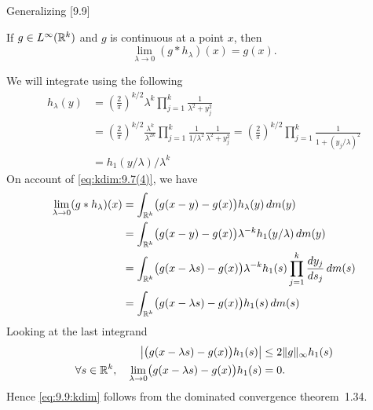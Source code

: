\begin{enumerate}
Generalizing [9.9]
\begin{llem} \label{lem:9.9:kdim}
If \(g\in L^\infty(\mathbb{R}^k)\) and $g$ is continuous at a point $x$, then
\begin{equation}
\lim_{\lambda\to 0} (g \ast h_\lambda)(x) = g(x). \label{eq:9.9:kdim}
\end{equation}
\end{llem}
\begin{thmproof}
We will integrate using the following
\begin{align*}
h_\lambda(y)
&= \left(\frac{2}{\pi}\right)^{k/2} \lambda^k
   \prod_{j=1}^k \frac{1}{\lambda^2+y_j^2}
  \\
&= \left(\frac{2}{\pi}\right)^{k/2} \frac{\lambda^k}{\lambda^{2k}}
   \prod_{j=1}^k \frac{1}{1/\lambda^2}\frac{1}{\lambda^2+y_j^2}
=  \left(\frac{2}{\pi}\right)^{k/2} 
   \prod_{j=1}^k \frac{1}{1+(y_j/\lambda)^2}
 \\
&= h_1(y/\lambda) / \lambda^k
\end{align*}
On account of \eqref{eq:kdim:9.7(4)}, we have
\begin{align*}
\lim_{\lambda\to 0} (g \ast h_\lambda)(x) 
&= \int_{\mathbb{R}^k} \bigl(g(x-y) - g(x)\bigr)h_\lambda(y)\,dm(y) \\
&= \int_{\mathbb{R}^k} \bigl(g(x-y) - g(x)\bigr)\lambda^{-k}h_1(y/\lambda)\,dm(y) \\
&= \int_{\mathbb{R}^k} \bigl(g(x-\lambda s) - g(x)\bigr)
               \lambda^{-k}h_1(s) \prod_{j=1}^k \frac{dy_j}{ds_j}\,dm(s) \\
&= \int_{\mathbb{R}^k} \bigl(g(x-\lambda s) - g(x)\bigr)h_1(s) \,dm(s) 
\end{align*}
Looking at the last integrand
\begin{align*}
\left|\bigl(g(x-\lambda s) - g(x)\bigr)h_1(s)\right| 
     &\leq 2\|g\|_\infty h_1(s) \\
\forall s\in\mathbb{R}^k,\quad 
  \lim_{\lambda\to 0} \bigl(g(x-\lambda s) - g(x)\bigr)h_1(s) &= 0.
\end{align*}
Hence \eqref{eq:9.9:kdim} follows from
the dominated convergence theorem~1.34.
\end{thmproof}


\end{enumerate}
